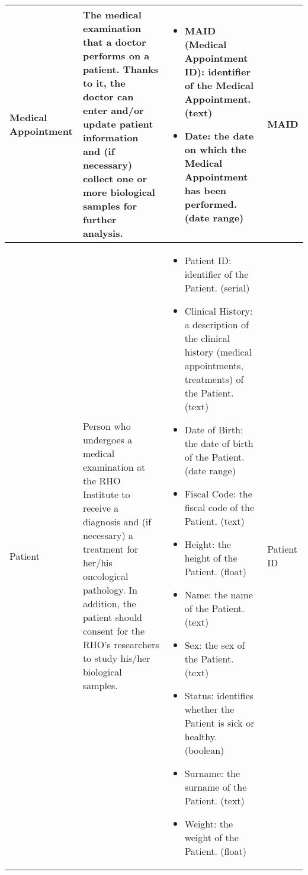 \begin{longtable}{|p{}|p{} |p{}|p{} |}
Medical Appointment & The medical examination that a doctor performs on a patient. Thanks to it, the doctor can enter and/or update patient information and (if necessary) collect one or more biological samples for further analysis. & \begin{itemize}
        \vspace{-1em}
        \item MAID (Medical Appointment ID): identifier of the Medical Appointment. (text)
        \item Date: the date on which the Medical Appointment has been performed. (date range)
    \end{itemize}
 &  MAID\\\hline

Patient & Person who undergoes a medical examination at the RHO Institute to receive a diagnosis and (if necessary) a treatment for her/his oncological pathology. In addition, the patient should consent for the RHO's researchers to study his/her biological samples. & \begin{itemize}
        \vspace{-1em}
        \item Patient ID: identifier of the Patient. (serial)
        \item Clinical History: a description of the clinical history (medical appointments, treatments) of the Patient. (text)
        \item Date of Birth: the date of birth of the Patient. (date range)
        \item Fiscal Code: the fiscal code of the Patient. (text)
        \item Height: the height of the Patient. (float)
        \item Name: the name of the Patient. (text)
        \item Sex: the sex of the Patient. (text)
        \item Status: identifies whether the Patient is sick or healthy. (boolean)
        \item Surname: the surname of the Patient. (text)
        \item Weight: the weight of the Patient. (float)
    \end{itemize}
 &  Patient ID\\\hline


\end{longtable}
